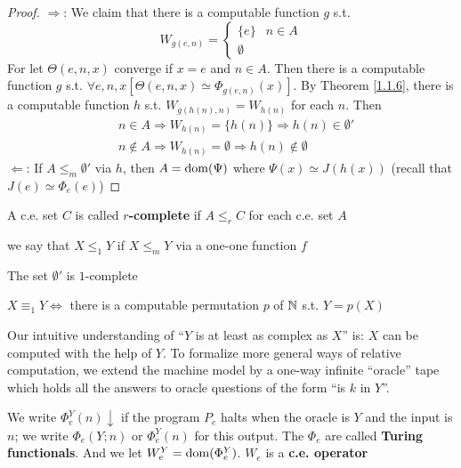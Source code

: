 \documentclass[11pt]{article}
\begin{document}
\begin{proof}
\(\Rightarrow\): We claim that there is a computable function \(g\) s.t.
\begin{equation*}
W_{g(e,n)}=
\begin{cases}
\{e\}&n\in A\\
\emptyset
\end{cases}
\end{equation*}
For let \(\Theta(e,n,x)\) converge if \(x=e\) and \(n\in A\). Then there is a computable function \(g\)
s.t. \(\forall e,n,x[\Theta(e,n,x)\simeq\Phi_{g(e,n)}(x)]\). By Theorem \ref{1.1.6}, there is a computable
function \(h\) s.t. \(W_{g(h(n),n)}=W_{h(n)}\) for each \(n\). Then
\begin{align*}
&n\in A\Rightarrow W_{h(n)}=\{h(n)\}\Rightarrow h(n)\in\emptyset'\\
&n\notin A\Rightarrow W_{h(n)}=\emptyset\Rightarrow h(n)\notin\emptyset
\end{align*}
\(\Leftarrow\): If \(A\le_m\emptyset'\) via \(h\), then \(A=\operatorname{dom}(\Psi)\) where \(\Psi(x)\simeq J(h(x))\) (recall
that \(J(e)\simeq\Phi_e(e)\))
\end{proof}

\begin{definition}[]
A c.e. set \(C\) is called \textbf{\(r\)-complete} if \(A\le_rC\) for each c.e. set \(A\)
\end{definition}

we say that \(X\le_1Y\) if \(X\le_mY\) via a one-one function \(f\)

\begin{exercise}
\label{1.2.4}
The set \(\emptyset'\) is \(1\)-complete
\end{exercise}

\begin{exercise}
\label{1.2.5}
\(X\equiv_1 Y\Leftrightarrow\) there is a computable permutation \(p\) of \(\mathbb{N}\) s.t. \(Y=p(X)\)
\end{exercise}

Our intuitive understanding of ``\(Y\) is at least as complex as \(X\)'' is: \(X\) can be computed
with the help of \(Y\). To formalize more general ways of relative computation, we extend the
machine model by a one-way infinite ``oracle'' tape which holds all the answers to oracle
questions of the form ``is \(k\) in \(Y\)''.

We write \(\Phi_e^Y(n)\downarrow\) if the program \(P_e\) halts when the oracle is \(Y\) and the input
is \(n\); we write \(\Phi_e(Y;n)\) or \(\Phi_e^Y(n)\) for this output. The \(\Phi_e\) are called \textbf{Turing
functionals}. And we let \(W_e^Y=\operatorname{dom}(\Phi_e^Y)\). \(W_e\) is a \textbf{c.e. operator}
\end{document}

